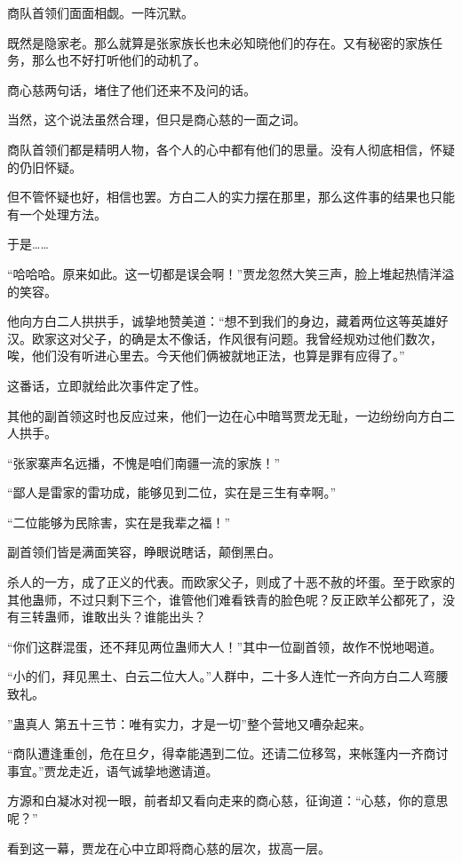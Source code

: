 \begin{this_body}
商队首领们面面相觑。一阵沉默。

既然是隐家老。那么就算是张家族长也未必知晓他们的存在。又有秘密的家族任务，那么也不好打听他们的动机了。

商心慈两句话，堵住了他们还来不及问的话。

当然，这个说法虽然合理，但只是商心慈的一面之词。

商队首领们都是精明人物，各个人的心中都有他们的思量。没有人彻底相信，怀疑的仍旧怀疑。

但不管怀疑也好，相信也罢。方白二人的实力摆在那里，那么这件事的结果也只能有一个处理方法。

于是……

“哈哈哈。原来如此。这一切都是误会啊！”贾龙忽然大笑三声，脸上堆起热情洋溢的笑容。

他向方白二人拱拱手，诚挚地赞美道：“想不到我们的身边，藏着两位这等英雄好汉。欧家这对父子，的确是太不像话，作风很有问题。我曾经规劝过他们数次，唉，他们没有听进心里去。今天他们俩被就地正法，也算是罪有应得了。”

这番话，立即就给此次事件定了性。

其他的副首领这时也反应过来，他们一边在心中暗骂贾龙无耻，一边纷纷向方白二人拱手。

“张家寨声名远播，不愧是咱们南疆一流的家族！”

“鄙人是雷家的雷功成，能够见到二位，实在是三生有幸啊。”

“二位能够为民除害，实在是我辈之福！”

副首领们皆是满面笑容，睁眼说瞎话，颠倒黑白。

杀人的一方，成了正义的代表。而欧家父子，则成了十恶不赦的坏蛋。至于欧家的其他蛊师，不过只剩下三个，谁管他们难看铁青的脸色呢？反正欧羊公都死了，没有三转蛊师，谁敢出头？谁能出头？

“你们这群混蛋，还不拜见两位蛊师大人！”其中一位副首领，故作不悦地喝道。

“小的们，拜见黑土、白云二位大人。”人群中，二十多人连忙一齐向方白二人弯腰致礼。

”蛊真人 第五十三节：唯有实力，才是一切”整个营地又嘈杂起来。

“商队遭逢重创，危在旦夕，得幸能遇到二位。还请二位移驾，来帐篷内一齐商讨事宜。”贾龙走近，语气诚挚地邀请道。

方源和白凝冰对视一眼，前者却又看向走来的商心慈，征询道：“心慈，你的意思呢？”

看到这一幕，贾龙在心中立即将商心慈的层次，拔高一层。


\end{this_body}
